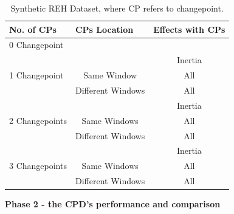 \documentclass[]{interact}
\theoremstyle{plain}%
\theoremstyle{definition}
\theoremstyle{remark}
\begin{document}
{	\begin{table}[h]
		\centering
		\small
		\begin{tabular}{|l|c|c|}
			\hline
			\textbf{No. of CPs} & \multicolumn{1}{l|}{\textbf{CPs Location}} & \multicolumn{1}{l|}{\textbf{Effects with CPs}} \\ \hline
			0 Changepoint                &                                                                &                \\ \hline
			&                                                                & Inertia                                     \\ \cline{2-3} 
			1 Changepoint                & Same Window                                                    & All                                    \\ \cline{2-3} 
			& Different Windows                                              & All                                         \\ \hline
			&                                                                & Inertia                                     \\ \cline{2-3} 
			2 Changepoints               & Same Windows                                                   & All                                    \\ \cline{2-3} 
			& Different Windows                                              & All                                         \\ \hline
			&                                                                & Inertia                                     \\ \cline{2-3} 
			3 Changepoints               & Same Windows                                                   & All                                    \\ \cline{2-3} 
			& Different Windows                                              & All                                         \\ \hline
		\end{tabular}
		\caption{Synthetic REH Dataset, where CP refers to changepoint.}
		\label{Table 2}
	\end{table}
	
	\hspace{-0.55cm} \textbf{Phase 2 - the CPD's performance and comparison}\\
	
}
\end{document}
